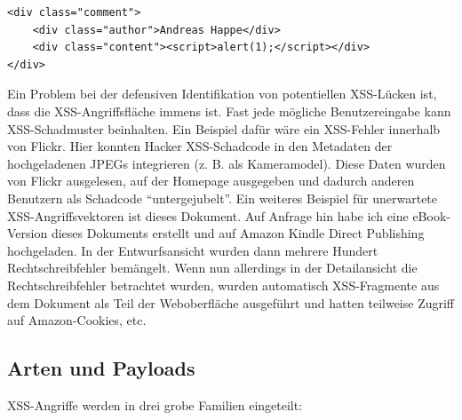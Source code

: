 \begin{verbatim}
<div class="comment">
	<div class="author">Andreas Happe</div>
	<div class="content"><script>alert(1);</script></div>
</div>
\end{verbatim}

Ein Problem bei der defensiven Identifikation von potentiellen XSS-Lücken ist, dass die XSS-Angriffsfläche immens ist. Fast jede mögliche Benutzereingabe kann XSS-Schadmuster beinhalten. Ein Beispiel dafür wäre ein XSS-Fehler innerhalb von Flickr. Hier konnten Hacker XSS-Schadcode in den Metadaten der hochgeladenen JPEGs integrieren (z. B. als Kameramodel). Diese Daten wurden von Flickr ausgelesen, auf der Homepage ausgegeben und dadurch anderen Benutzern als Schadcode ``untergejubelt''. Ein weiteres Beispiel für unerwartete XSS-Angriffsvektoren ist dieses Dokument. Auf Anfrage hin habe ich eine eBook-Version dieses Dokuments erstellt und auf Amazon Kindle Direct Publishing hochgeladen. In der Entwurfsansicht wurden dann mehrere Hundert Rechtschreibfehler bemängelt. Wenn nun allerdings in der Detailansicht die Rechtschreibfehler betrachtet wurden, wurden automatisch XSS-Fragmente aus dem Dokument als Teil der Weboberfläche ausgeführt und hatten teilweise Zugriff auf Amazon-Cookies, etc.

\subsection{Arten und Payloads}

XSS-Angriffe werden in drei grobe Familien eingeteilt:

